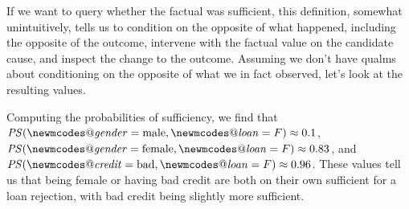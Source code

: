\documentclass[anon,12pt]{clear2026} %
\makeatletter
\DeclareRobustCommand{\varname}[1]{\begingroup\newmcodes@\mathit{#1}\endgroup}
\newcommand{\ps}{\ensuremath{\mathit{PS}}}
\makeatother
\begin{document}
If we want to query whether the factual was sufficient, this definition, somewhat unintuitively, tells us to condition on the opposite of what happened, including the opposite of the outcome, intervene with the factual value on the candidate cause, and inspect the change to the outcome.
Assuming we don't have qualms about conditioning on the opposite of what we in fact observed, let's look at the resulting values. 

Computing the probabilities of sufficiency, we find that $\ps(\varname{gender}=\text{male}, \varname{loan}=F) \approx 0.1$, $\ps(\varname{gender}=\text{female}, \varname{loan}=F) \approx 0.83$, and $\ps(\varname{credit}=\text{bad}, \varname{loan}=F) \approx 0.96$.
These values tell us that being female or having bad credit are both on their own sufficient for a loan rejection, with bad credit being slightly more sufficient.
\end{document}
